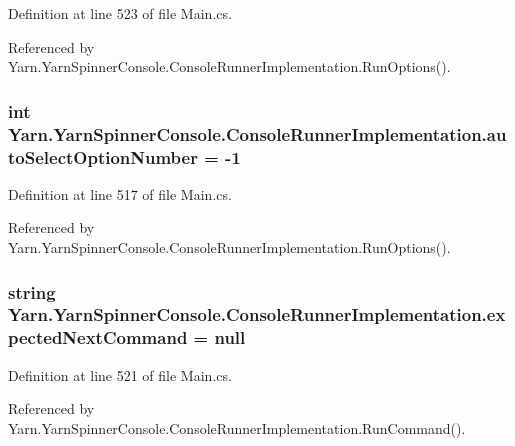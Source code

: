 Definition at line 523 of file Main.\-cs.



Referenced by Yarn.\-Yarn\-Spinner\-Console.\-Console\-Runner\-Implementation.\-Run\-Options().

\hypertarget{a00055_a34886671e91a1bf3fc225eeb67baced1}{
\subsubsection[{auto\-Select\-Option\-Number}]{\setlength{\rightskip}{0pt plus 5cm}int Yarn.\-Yarn\-Spinner\-Console.\-Console\-Runner\-Implementation.\-auto\-Select\-Option\-Number = -\/1}}\label{a00055_a34886671e91a1bf3fc225eeb67baced1}


Definition at line 517 of file Main.\-cs.



Referenced by Yarn.\-Yarn\-Spinner\-Console.\-Console\-Runner\-Implementation.\-Run\-Options().

\hypertarget{a00055_a3c7133c65dc7cf293f49b61426a0c4aa}{
\subsubsection[{expected\-Next\-Command}]{\setlength{\rightskip}{0pt plus 5cm}string Yarn.\-Yarn\-Spinner\-Console.\-Console\-Runner\-Implementation.\-expected\-Next\-Command = null}}\label{a00055_a3c7133c65dc7cf293f49b61426a0c4aa}


Definition at line 521 of file Main.\-cs.



Referenced by Yarn.\-Yarn\-Spinner\-Console.\-Console\-Runner\-Implementation.\-Run\-Command().

